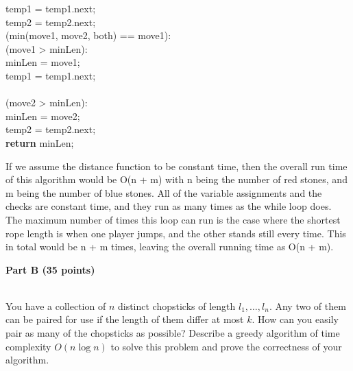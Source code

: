 \documentclass{article}
\begin{document}
\begin{algorithm}[h]
			\hspace{1.5in}temp1 = temp1.next;\\
			\hspace{1.5in}temp2 = temp2.next;\\
		 (min(move1, move2, both) == move1):\\
			 (move1 > minLen):\\
				\hspace{2in}minLen = move1;\\
			\hspace{1.5in}temp1 = temp1.next;\\
		\\
			 (move2 > minLen):\\
				\hspace{2in}minLen = move2;\\
			\hspace{1.5in}temp2 = temp2.next;\\
{\bf {return}} minLen;\\
		
\end{algorithm}

  If we assume the distance function to be constant time, then the overall run time 
of this algorithm would be O(n + m) with n being the number of red stones, and m being the number of blue 
stones.  All of the variable assignments and the checks are constant time, and they run as many times as
the while loop does.  The maximum number of times this loop can run is the case where the shortest 
rope length is when one player jumps, and the other stands still every time.  This in total would be n + m times, leaving the overall running time as O(n + m).

\begin{center}
{\bf Part B (35 points)}
\end{center}

\\

 You have a collection of $n$ distinct chopsticks of
length $l_{1},\dots,l_{n}$. Any two of them can be paired for use if
the length of them differ at most $k$. How can you easily pair as many
of the chopsticks as possible? Describe a greedy algorithm of time
complexity $O(n\log n)$ to solve this problem and prove the
correctness of your algorithm.\\
\end{document}
